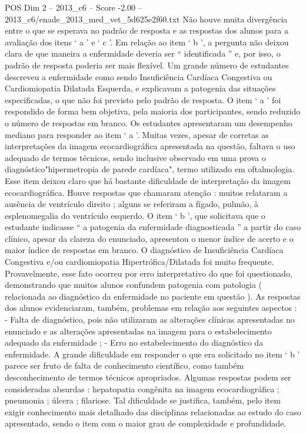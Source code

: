 \begin{textsample}{POS Dim 2 – 2013\_c6 – Score -2.00 – 2013\_c6/enade\_2013\_med\_vet\_5d625e2f60.txt}
Não houve muita divergência entre o que se esperava no padrão de resposta e as respostas dos alunos para a avaliação dos itens ‘ a ’ e ‘ c ’.
Em relação ao item ‘ b ’, a pergunta não deixou clara de que maneira a enfermidade deveria ser “ identificada ” e, por isso, o padrão de resposta poderia ser mais flexível.
Um grande número de estudantes descreveu a enfermidade como sendo Insuficiência Cardíaca Congestiva ou Cardiomiopatia Dilatada Esquerda, e explicavam a patogenia das situações especificadas, o que não foi previsto pelo padrão de resposta.
O item ‘ a ’ foi respondido de forma bem objetiva, pela maioria dos participantes, sendo reduzido o número de respostas em branco.
Os estudantes apresentaram um desempenho mediano para responder ao item ‘ a ’.
Muitas vezes, apesar de corretas as interpretações da imagem ecocardiográfica apresentada na questão, faltava o uso adequado de termos técnicos, sendo inclusive observado em uma prova o diagnóstico"hipermetropia de parede cardíaca", termo utilizado em oftalmologia.
Esse item deixou claro que há bastante dificuldade de interpretação da imagem ecocardiográfica.
Houve respostas que chamaram atenção : muitos relataram a ausência de ventrículo direito ; alguns se referiram a fígado, pulmão, à esplenomegalia do ventrículo esquerdo.
O item ‘ b ’, que solicitava que o estudante indicasse “ a patogenia da enfermidade diagnosticada ” a partir do caso clínico, apesar da clareza do enunciado, apresentou o menor índice de acerto e o maior índice de respostas em branco.
O diagnóstico de Insuficiência Cardíaca Congestiva e/ou cardiomiopatia Hipertrófica/Dilatada foi muito frequente.
Provavelmente, esse fato ocorreu por erro interpretativo do que foi questionado, demonstrando que muitos alunos confundem patogenia com patologia ( relacionada ao diagnóstico da enfermidade no paciente em questão ).
As respostas dos alunos evidenciaram, também, problemas em relação aos seguintes aspectos : - Falta de diagnóstico, pois não utilizaram as alterações clínicas apresentadas no enunciado e as alterações apresentadas na imagem para o estabelecimento adequado da enfermidade ; - Erro no estabelecimento do diagnóstico da enfermidade.
A grande dificuldade em responder o que era solicitado no item ‘ b ’ parece ser fruto de falta de conhecimento científico, como também desconhecimento de termos técnicos apropriados.
Algumas respostas podem ser consideradas absurdas : hepatopatia congênita na imagem ecocardiográfica ; pneumonia ; úlcera ; filariose.
Tal dificuldade se justifica, também, pelo item exigir conhecimento mais detalhado das disciplinas relacionadas ao estudo do caso apresentado, sendo o item com o maior grau de complexidade e profundidade.

\end{textsample}
